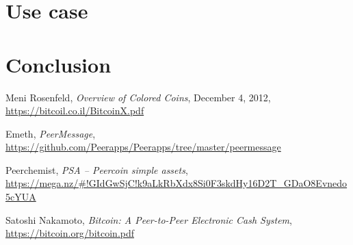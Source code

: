 \documentclass[a4paper,10pt]{article}
\begin{document}
\section{Use case}

\section{Conclusion}


\begin{thebibliography}{9}

  Meni Rosenfeld,
  \emph{Overview of Colored Coins},
  December 4, 2012,
  \url{https://bitcoil.co.il/BitcoinX.pdf}

  Emeth,
  \emph{PeerMessage},
  \url{https://github.com/Peerapps/Peerapps/tree/master/peermessage}

  Peerchemist,
  \emph{PSA – Peercoin simple assets},
  \url{https://mega.nz/#!GIdGwSjC!k9aLkRbXdx8Si0F3skdHy16D2T_GDaO8Evnedo5cYUA}

  Satoshi Nakamoto,
  \emph{Bitcoin: A Peer-to-Peer Electronic Cash System},
  \url{https://bitcoin.org/bitcoin.pdf}

\end{thebibliography}
\end{document}
